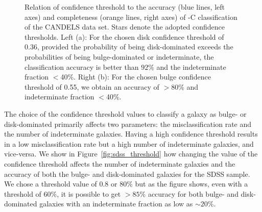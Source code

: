 \begin{figure}[htb]
	\begin{center}
  \end{center}
  \caption{Relation of confidence threshold to the accuracy (blue lines, left axes) and completeness (orange lines, right axes) of \gamornet{}-C classification of the CANDELS data set. Stars denote the adopted confidence thresholds.
  Left (a): For the chosen disk confidence threshold of 0.36, provided the probability of being disk-dominated exceeds the probabilities of being bulge-dominated or indeterminate, the classification accuracy is better than $92\%$ and the indeterminate fraction $<$40\%.
  Right (b): For the chosen bulge confidence threshold of 0.55, we obtain an accuracy of $>$80\% and indeterminate fraction $<$40\%. }
  \label{fig:candels_threshold}
\end{figure}

The choice of the confidence threshold values to classify a galaxy as bulge- or disk-dominated primarily affects two parameters: the misclassification rate and the number of indeterminate galaxies. Having a high confidence threshold results in a low misclassification rate but a high number of indeterminate galaxies, and vice-versa. We show in Figure~\ref{fig:sdss_threshold} how changing the value of the confidence threshold affects the number of indeterminate galaxies and the accuracy of both the bulge- and disk-dominated galaxies for the SDSS sample. We chose a threshold value of 0.8 or $80\%$ but as the figure shows, even with a threshold of 60\%, it is possible to get $> 85\%$ accuracy for both bulge- and disk-dominated galaxies with an indeterminate fraction as low as $\sim 20\%$.

